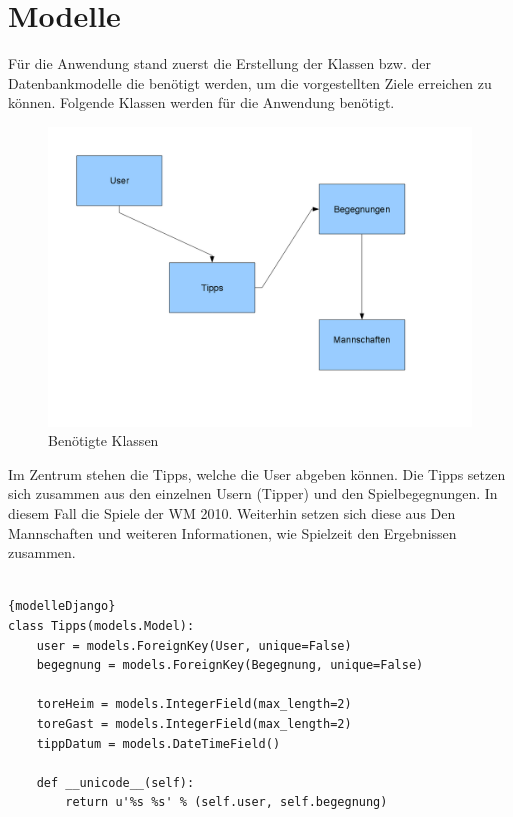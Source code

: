\documentclass[titlepage, 12pt,a4paper]{scrartcl}
\begin{document}
\section{Modelle}
Für die Anwendung stand zuerst die Erstellung der Klassen bzw. der
Datenbankmodelle die benötigt werden, um die vorgestellten Ziele erreichen zu
können. Folgende Klassen werden für die Anwendung benötigt. 

\begin{figure}[ht]
 \begin{center}
  \includegraphics[scale=0.5]{pictures/klassen.png}
 \end{center}
 \caption{Benötigte Klassen}
 \label{klassen}
\end{figure}

Im Zentrum stehen die Tipps, welche die User abgeben können. Die Tipps setzen
sich zusammen aus den einzelnen Usern (Tipper) und den Spielbegegnungen. In
diesem Fall die Spiele der WM 2010. Weiterhin setzen sich diese aus Den
Mannschaften und weiteren Informationen, wie Spielzeit den Ergebnissen zusammen.
\\
\\

\begin{lstlisting}[caption=Modelle in Django]{modelleDjango}
class Tipps(models.Model):
    user = models.ForeignKey(User, unique=False)
    begegnung = models.ForeignKey(Begegnung, unique=False)
    
    toreHeim = models.IntegerField(max_length=2)
    toreGast = models.IntegerField(max_length=2)
    tippDatum = models.DateTimeField()
    
    def __unicode__(self):
        return u'%s %s' % (self.user, self.begegnung)
   
\end{lstlisting}
\end{document}
